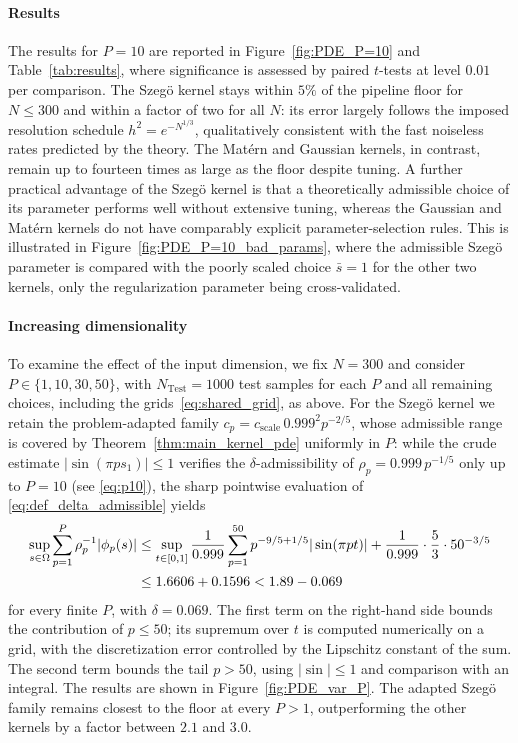 \documentclass[11pt]{article}
\numberwithin{equation}{section}
\theoremstyle{plain}
\theoremstyle{definition}
\theoremstyle{remark}
\begin{document}
\paragraph{Results}
The results for $P=10$ are reported in Figure~\ref{fig:PDE_P=10} and Table~\ref{tab:results}, where significance is assessed by paired $t$-tests at level $0.01$ per comparison. The Szegö kernel stays within $5\%$ of the pipeline floor for $N\leq300$ and within a factor of two for all $N$: its error largely follows the imposed resolution schedule $h^2=e^{-N^{1/3}}$, qualitatively consistent with the fast noiseless rates predicted by the theory. The Matérn and Gaussian kernels, in contrast, remain up to fourteen times as large as the floor despite tuning. A further practical advantage of the Szegö kernel is that a theoretically admissible choice of its parameter performs well without extensive tuning, whereas the Gaussian and Matérn kernels do not have comparably explicit parameter-selection rules. This is illustrated in Figure~\ref{fig:PDE_P=10_bad_params}, where the admissible Szegö parameter is compared with the poorly scaled choice $\bar s=1$ for the other two kernels, only the regularization parameter being cross-validated.

\paragraph{Increasing dimensionality}
To examine the effect of the input dimension, we fix $N=300$ and consider $P\in\{1,10,30,50\}$, with $N_{\mathrm{Test}}=1000$ test samples for each $P$ and all remaining choices, including the grids~\eqref{eq:shared_grid}, as above. For the Szegö kernel we retain the problem-adapted family $c_p=c_{\mathrm{scale}}\,0.999^2p^{-2/5}$, whose admissible range is covered by Theorem~\ref{thm:main_kernel_pde} uniformly in $P$: while the crude estimate $|\sin(\pi ps_1)|\leq1$ verifies the $\delta$-admissibility of $\rho_p=0.999\,p^{-1/5}$ only up to $P=10$ (see \eqref{eq:p10}), the sharp pointwise evaluation of \eqref{eq:def_delta_admissible} yields
\begin{align}
\sup_{s\in\Omega}\sum_{p=1}^{P}\rho_p^{-1}|\phi_p(s)|
&\leq
\sup_{t\in[0,1]}\frac{1}{0.999}\sum_{p=1}^{50}p^{-9/5+1/5}|\sin(\pi pt)|
+\frac{1}{0.999}\cdot\frac53\cdot50^{-3/5}\notag\\
&\leq
1.6606+0.1596<1.89-0.069
\label{eq:sharp_admissible}
\end{align}
for every finite $P$, with $\delta=0.069$. The first term on the right-hand
side bounds the contribution of $p\leq50$; its supremum over $t$ is computed
numerically on a grid, with the discretization error controlled by the
Lipschitz constant of the sum. The second term bounds the tail $p>50$, using
$|\sin|\leq1$ and comparison with an integral. The results are shown in Figure~\ref{fig:PDE_var_P}. The adapted Szegö family remains closest to the floor at every $P>1$, outperforming the other kernels by a factor between $2.1$ and $3.0$.
\end{document}
